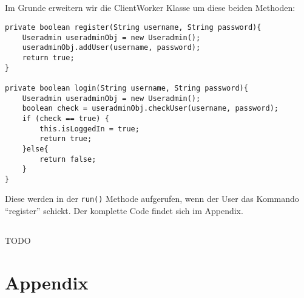 \documentclass[10pt,a4paper]{article}
\begin{document}
\subsection{}
Im Grunde erweitern wir die ClientWorker Klasse um diese beiden Methoden:
\begin{verbatim}
private boolean register(String username, String password){
    Useradmin useradminObj = new Useradmin();
    useradminObj.addUser(username, password);
    return true;
}

private boolean login(String username, String password){
    Useradmin useradminObj = new Useradmin();
    boolean check = useradminObj.checkUser(username, password);
    if (check == true) {
        this.isLoggedIn = true;
        return true;
    }else{
        return false;
    }
}
\end{verbatim}
Diese werden in der \texttt{run()} Methode aufgerufen,
wenn der User das Kommando ``register'' schickt. Der komplette
Code findet sich im Appendix.

\subsection{}
TODO


\newpage
\section{Appendix}
\end{document}
